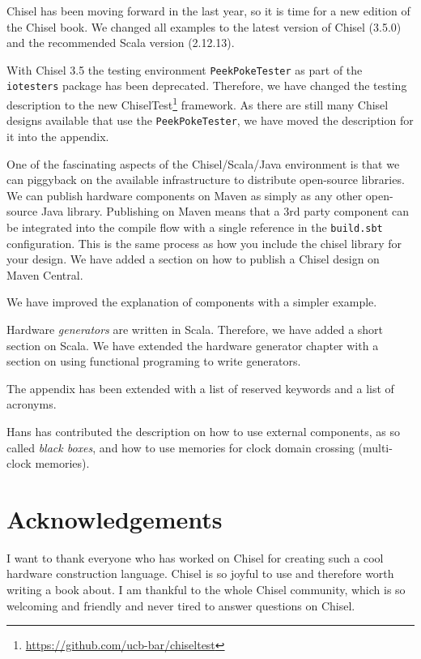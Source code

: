 \documentclass[%
    10pt,
    headinclude, footexclude,
    openright, %
    notitlepage,
    cleardoubleempty,
    headsepline,
    pointlessnumbers,
    bibtotoc, idxtotoc,
    ]{scrbook}
\newcommand{\code}[1]{{\small{\texttt{#1}}}}
\newcommand{\myref}[2]{\href{#1}{#2}}
\renewcommand{\myref}[2]{{#2}{\footnote{\url{#1}}}}
\begin{document}
Chisel has been moving forward in the last year, so it is time for a new edition of the Chisel book.
We changed all examples to the latest version of Chisel (3.5.0) and the recommended
Scala version (2.12.13).

With Chisel 3.5 the testing environment \code{PeekPokeTester} as part of the \code{iotesters}
package has been deprecated. Therefore, we have changed the testing description to the new
\myref{https://github.com/ucb-bar/chiseltest}{ChiselTest} framework.
As there are still many Chisel designs available that use the \code{PeekPokeTester},
we have moved the description for it into the appendix.

One of the fascinating aspects of the Chisel/Scala/Java environment is that we
can piggyback on the available infrastructure to distribute open-source libraries.
We can publish hardware components on Maven as simply as any other open-source Java library.
Publishing on Maven means that a 3rd party component can be integrated into the
compile flow with a single reference in the \code{build.sbt} configuration.
This is the same process as how you include the chisel library for your design.
We have added a section on how to publish a Chisel design on Maven Central.

We have improved the explanation of components with a simpler example.

Hardware \emph{generators} are written in Scala. Therefore, we have added a short
section on Scala. We have extended the hardware generator chapter with a section
on using functional programing to write generators.

The appendix has been extended with a list of reserved keywords and a list
of acronyms.

Hans has contributed the description on how to use external components, as
so called \emph{black boxes}, and how to use memories for clock domain crossing
(multi-clock memories).




\section*{Acknowledgements}

I want to thank everyone who has worked on Chisel for creating such
a cool hardware construction language. Chisel is so joyful to use and
therefore worth writing a book about.
I am thankful to the whole Chisel community, which is so welcoming and friendly
and never tired to answer questions on Chisel.
\end{document}
